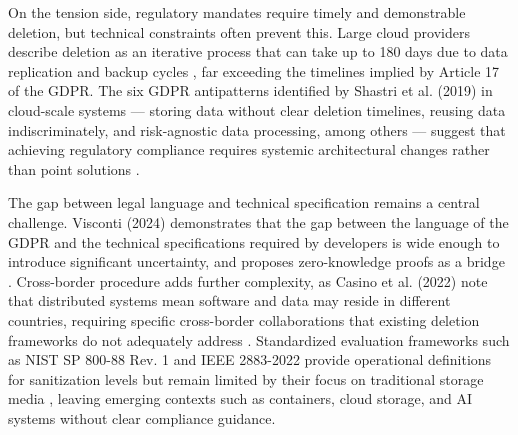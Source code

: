 On the tension side, regulatory mandates require timely and demonstrable deletion, but technical 
constraints often prevent this. Large cloud providers describe deletion as an iterative process 
that can take up to 180 days due to data replication and backup cycles \cite{Birrell2024SoK}, far 
exceeding the timelines implied by Article 17 of the GDPR. The six GDPR antipatterns identified by 
Shastri et al. (2019) in cloud-scale systems — storing data without clear deletion timelines, 
reusing data indiscriminately, and risk-agnostic data processing, among others — suggest that 
achieving regulatory compliance requires systemic architectural changes rather than point solutions \cite{Shastri2019gdpr}.

The gap between legal language and technical specification remains a central challenge. Visconti 
(2024) demonstrates that the gap between the language of the GDPR and the technical specifications 
required by developers is wide enough to introduce significant uncertainty, and proposes 
zero-knowledge proofs as a bridge \cite{Visconti2024zeroknowledge}. Cross-border procedure adds 
further complexity, as Casino et al. (2022) note that distributed systems mean software and data 
may reside in different countries, requiring specific cross-border collaborations that existing 
deletion frameworks do not adequately address \cite{Casino2022Research}. Standardized evaluation 
frameworks such as NIST SP 800-88 Rev. 1 and IEEE 2883-2022 provide operational definitions for 
sanitization levels but remain limited by their focus on traditional storage media \cite{aronsson2025secure},
leaving emerging contexts such as containers, cloud storage, and AI systems without clear compliance guidance.


\vfill